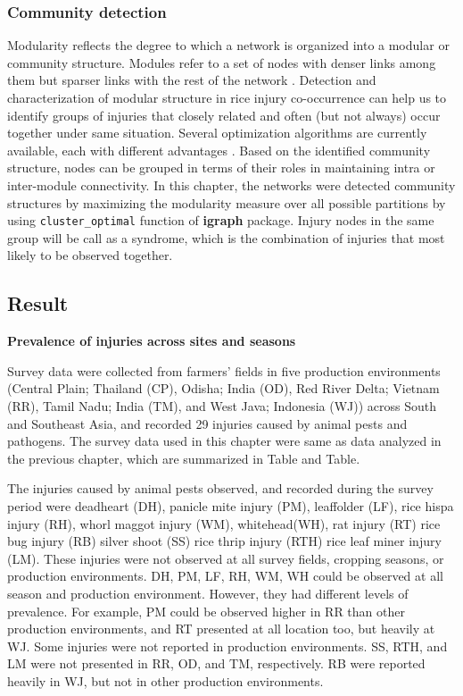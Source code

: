 \subsubsection{Community detection}

Modularity reflects the degree to which a network is organized into a modular or community structure. Modules refer to a set of nodes with denser links among them but sparser links with the rest of the network \citep{Newman_2006_Modularity}. Detection and characterization of modular structure in rice injury co-occurrence can help us to identify groups of injuries that closely related and often (but not always) occur together under same situation. Several optimization algorithms are currently available, each with different advantages \citep{Brandes_2008_Modularity}. Based on the identified community structure, nodes can be grouped in terms of their roles in maintaining intra or inter-module connectivity. In this chapter, the networks were detected community structures by maximizing the modularity measure over all possible partitions by using \texttt{cluster\_optimal} function of \textbf{igraph} package. Injury nodes in the same group will be call as a syndrome, which is the combination of injuries that most likely to be observed together. 

\subsection{Result}

\textbf{Prevalence of injuries across sites and seasons}

Survey data were collected from farmers’ fields in five production environments (Central Plain; Thailand (CP), Odisha; India (OD), Red River Delta; Vietnam (RR), Tamil Nadu; India (TM), and West Java; Indonesia (WJ)) across South and Southeast Asia, and recorded 29 injuries caused by animal pests and pathogens.  The survey data used in this chapter were same as data analyzed in the previous chapter, which are summarized in Table and Table.

The injuries caused by animal pests observed, and recorded during the survey period were deadheart (DH), panicle mite injury (PM), leaffolder (LF), rice hispa injury (RH), whorl maggot injury (WM), whitehead(WH), rat injury (RT) rice bug injury (RB) silver shoot (SS) rice thrip injury (RTH) rice leaf miner injury (LM). These injuries were not observed at all survey fields, cropping seasons, or production environments.  DH, PM, LF, RH, WM, WH could be observed at all season and production environment. However, they had different levels of prevalence. For example, PM could be observed higher in RR than other production environments, and RT presented at all location too, but heavily at WJ. Some injuries were not reported in production environments. SS, RTH, and LM were not presented in RR, OD, and TM, respectively. RB were reported heavily in WJ, but not in other production environments.  
 
